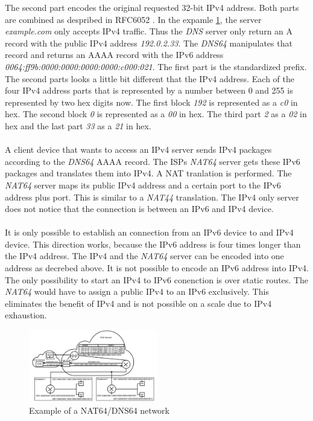 \documentclass[format=sigconf, natbib=true, nonacm=true]{acmart}
\begin{document}
    The second part encodes the original requested 32-bit IPv4 address. Both parts are combined as despribed in RFC6052 \cite{rfc6052}. In the expamle \ref{fig:nat_64_dns_64}, the server \textit{example.com} only accepts IPv4 traffic. Thus the \textit{DNS} server only return an A record with the public IPv4 address \textit{192.0.2.33}. The \textit{DNS64} manipulates that record and returns an AAAA record with the IPv6 address \textit{0064:ff9b:0000:0000:0000:0000:c000:021}. The first part is the standardized prefix. The second parts looks a little bit different that the IPv4 address. Each of the four IPv4 address parts that is represented by a number between 0 and 255 is represented by two hex digits now. The first block \textit{192} is represented as a \textit{c0} in hex. The second block \textit{0} is represented as a \textit{00} in hex. The third part \textit{2} as a \textit{02} in hex and the last part \textit{33} as a \textit{21} in hex\cite{rfc6052}.\\\\A client device that wants to access an IPv4 server sends IPv4 packages according to the \textit{DNS64} AAAA record. The ISPs \textit{NAT64} server gets these IPv6 packages and translates them into IPv4. A NAT tranlation is performed. The \textit{NAT64} server maps its public IPv4 address and a certain port to the IPv6 address plus port. This is similar to a \textit{NAT44} translation. The IPv4 only server does not notice that the connection is between an IPv6 and IPv4 device.\\\\It is only possible to establish an connection from an IPv6 device to and IPv4 device. This direction works, because the IPv6 address is four times longer than the IPv4 address. The IPv4 and the \textit{NAT64} server can be encoded into one address as decrebed above. It is not possible to encode an IPv6 address into IPv4. The only possibility to start an IPv4 to IPv6 conenction is over static routes. The \textit{NAT64} would have to assign a public IPv4 to an IPv6 exclusively. This eliminates the benefit of IPv4 and is not possible on a scale due to IPv4 exhaustion\cite{rfc6146}.
    \begin{figure}
        \centering
        \includegraphics[width=0.5\textwidth]{images/nat_64_dns_64.png}
        \caption{Example of a NAT64/DNS64 network}
        \label{fig:nat_64_dns_64}
    \end{figure}
\end{document}

